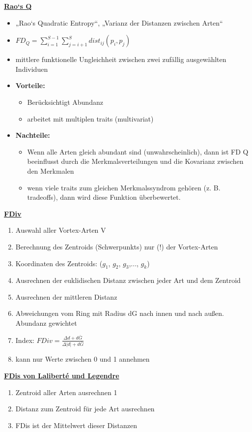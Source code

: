 \newpage
\underline{\textbf{Rao‘s Q}}
\begin{itemize}
	\item „Rao‘s Quadratic Entropy“, „Varianz der Distanzen zwischen Arten“
	\item $FD_Q=\displaystyle \sum_{i=1}^{S-1}\sum_{j=i+1}^{S} dist_{ij}(p_i,p_j)$
	\item mittlere funktionelle Ungleichheit zwischen zwei zufällig ausgewählten Individuen
	\item \textbf{Vorteile:}
	\begin{itemize}
		\item Berücksichtigt Abundanz
		\item arbeitet mit multiplen traits (multivariat)
	\end{itemize}
	\item \textbf{Nachteile:}
	\begin{itemize}
		\item Wenn alle Arten gleich abundant sind (unwahrscheinlich), dann ist FD Q beeinflusst durch die Merkmalsverteilungen und die Kovarianz zwischen den Merkmalen
		\item wenn viele traits zum gleichen Merkmalssyndrom gehören (z. B. tradeoffs), dann wird diese Funktion	überbewertet.
	\end{itemize}
\end{itemize}

\underline{\textbf{FDiv}}
\begin{enumerate}
	\item Auswahl aller Vortex-Arten V
	\item Berechnung des Zentroids (Schwerpunkts) nur (!) der Vortex-Arten
	\item Koordinaten des Zentroids: ($g_1$, $g_2$, $g_3$,..., $g_k$)
	\item Ausrechnen der euklidischen Distanz zwischen jeder Art und dem Zentroid
	\item Ausrechnen der mittleren Distanz
	\item Abweichungen vom Ring mit Radius dG nach innen und nach außen. Abundanz gewichtet
	\item Index: $FDiv=\displaystyle \frac{\Delta d + d\bar{G}}{\Delta |d| + d\bar{G}}$
	\item kann nur Werte zwischen 0 und 1 annehmen
\end{enumerate}

\underline{\textbf{FDis von Laliberté und Legendre}}
\begin{enumerate}
	\item Zentroid aller Arten ausrechnen 1
	\item Distanz zum Zentroid für jede Art ausrechnen
	\item FDis ist der Mittelwert dieser Distanzen
\end{enumerate}

